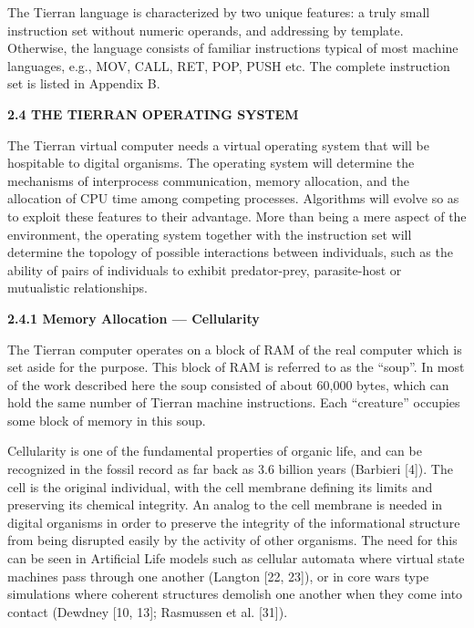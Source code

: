 The Tierran language is characterized by two unique features: a truly small
instruction set without numeric operands, and addressing by template.
Otherwise, the language consists of familiar instructions typical of most
machine languages, e.g., MOV, CALL, RET, POP, PUSH etc.  The complete
instruction set is listed in Appendix B.

\LP
\bf 2.4 THE TIERRAN OPERATING SYSTEM\rm
\eLP

The Tierran virtual computer needs a virtual operating system that will be
hospitable to digital organisms.  The operating system will determine the
mechanisms of interprocess communication, memory allocation, and the
allocation of CPU time among competing processes.  Algorithms will
evolve so as to exploit these features to their advantage.  More than being
a mere aspect of the environment, the operating system together with the
instruction set will determine the
topology of possible interactions between individuals, such as the ability
of pairs of individuals to exhibit predator-prey, parasite-host or 
mutualistic relationships.

\LP
\bf 2.4.1 Memory Allocation --- Cellularity\rm
\eLP

The Tierran computer operates on a block of RAM of the real computer which
is set aside for the purpose.  This block of RAM is referred to as the
``soup''.  In most of the work described here the soup consisted of about
60,000 bytes, which can hold the same number of Tierran machine instructions.
Each ``creature'' occupies some block of memory in this soup.

Cellularity is one of the fundamental properties of organic life, and can
be recognized in the fossil record as far back as 3.6 billion years (Barbieri
[4]).  The cell is the original individual, with the cell membrane defining
its limits and preserving its chemical integrity.  An analog to the cell
membrane is needed in digital organisms in order to preserve the integrity of
the informational structure from being disrupted easily by the activity of
other organisms.  The need for this can be seen in Artificial Life models
such as cellular automata where virtual state machines pass through one
another (Langton [22, 23]), or in core wars type simulations where
coherent structures demolish one another when they come into contact
(Dewdney [10, 13]; Rasmussen et al. [31]).

